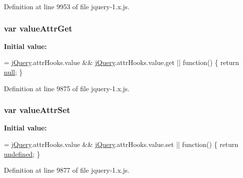 Definition at line 9953 of file jquery-\/1.\+x.\+js.

\subsubsection[{\texorpdfstring{value\+Attr\+Get}{valueAttrGet}}]{\setlength{\rightskip}{0pt plus 5cm}var value\+Attr\+Get}\hypertarget{jquery-1_8x_8js_a02010f66dba9fcc506d69b302cab41fb}{}\label{jquery-1_8x_8js_a02010f66dba9fcc506d69b302cab41fb}
{\bfseries Initial value\+:}
\begin{DoxyCode}
= \hyperlink{jquery-1_8x_8js_a2b1d6f9c448e3ce72f4e1865d6e38d2c}{jQuery}.attrHooks.value && \hyperlink{jquery-1_8x_8js_a2b1d6f9c448e3ce72f4e1865d6e38d2c}{jQuery}.attrHooks.value.get ||
        \textcolor{keyword}{function}() \{ \textcolor{keywordflow}{return} \hyperlink{modernizr_8min_8js_a286f9ec831c5e676eeb493248eab9575}{null}; \}
\end{DoxyCode}


Definition at line 9875 of file jquery-\/1.\+x.\+js.

\subsubsection[{\texorpdfstring{value\+Attr\+Set}{valueAttrSet}}]{\setlength{\rightskip}{0pt plus 5cm}var value\+Attr\+Set}\hypertarget{jquery-1_8x_8js_a4f03581a835ab99d3f66b59015ad49ae}{}\label{jquery-1_8x_8js_a4f03581a835ab99d3f66b59015ad49ae}
{\bfseries Initial value\+:}
\begin{DoxyCode}
= \hyperlink{jquery-1_8x_8js_a2b1d6f9c448e3ce72f4e1865d6e38d2c}{jQuery}.attrHooks.value && \hyperlink{jquery-1_8x_8js_a2b1d6f9c448e3ce72f4e1865d6e38d2c}{jQuery}.attrHooks.value.set ||
        \textcolor{keyword}{function}() \{ \textcolor{keywordflow}{return} \hyperlink{jquery-1_8x_8js_a08113a236cc18d2a9d5ce27e638012be}{undefined}; \}
\end{DoxyCode}


Definition at line 9877 of file jquery-\/1.\+x.\+js.

